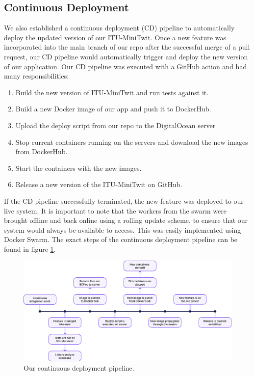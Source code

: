 \documentclass{article}
\begin{document}
\subsection{Continuous Deployment}
We also established a continuous deployment (CD) pipeline to automatically deploy the updated version of our ITU-MiniTwit. Once a new feature was incorporated into the main branch of our repo after the successful merge of a pull request, our CD pipeline would automatically trigger and deploy the new version of our application. Our CD pipeline was executed with a GitHub action and had many responsibilities:

\begin{enumerate}
    \item Build the new version of ITU-MiniTwit and run tests against it.
    \item Build a new Docker image of our app and push it to DockerHub.
    \item Upload the deploy script from our repo to the DigitalOcean server
    \item Stop current containers running on the servers and download the new images from DockerHub.
    \item Start the containers with the new images.
    \item Release a new version of the ITU-MiniTwit on GitHub.
\end{enumerate}

If the CD pipeline successfully terminated, the new feature was deployed to our live system. It is important to note that the workers from the swarm were brought offline and back online using a rolling update scheme, to ensure that our system would always be available to access. This was easily implemented using Docker Swarm. The exact steps of the continuous deployment pipeline can be found in figure \ref{fig: cd_pipeline}.

\begin{figure}[ht]
    \centering
    \includegraphics[width=1.0\textwidth]{./images/CD_pipeline_v2.png} 
    \caption{Our continuous deployment pipeline.}
    \label{fig: cd_pipeline}
\end{figure}
\end{document}
